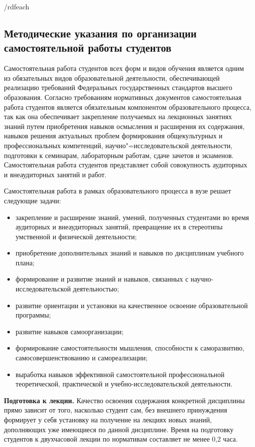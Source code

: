 \documentclass[12pt]{scrartcl}
\renewcommand{\paragraph}[1]{\par\textbf{#1}}
\begin{document}
{{/rdfeach}}



\subsection{Методические указания по организации самостоятельной работы студентов} %

Самостоятельная работа студентов всех форм и видов обучения является одним из
обязательных видов образовательной деятельности, обеспечивающей реализацию
требований Федеральных государственных стандартов высшего образования. Согласно
требованиям нормативных документов самостоятельная работа студентов является
обязательным компонентом образовательного процесса, так как она обеспечивает
закрепление получаемых на лекционных занятиях знаний путем приобретения навыков
осмысления и расширения их содержания, навыков решения актуальных проблем
формирования общекультурных и профессиональных компетенций, научно"=исследовательской деятельности, подготовки к семинарам, лабораторным работам, сдаче зачетов и экзаменов. Самостоятельная работа студентов представляет собой совокупность
аудиторных и внеаудиторных занятий и работ.

Самостоятельная работа в рамках
образовательного процесса в вузе решает следующие задачи:
\begin{itemize}
\item закрепление и расширение знаний, умений, полученных студентами во время
аудиторных и внеаудиторных занятий, превращение их в стереотипы умственной и
физической деятельности;
\item приобретение дополнительных знаний и навыков по дисциплинам учебного плана;
\item формирование и развитие знаний и навыков, связанных с научно-исследовательской
деятельностью;
\item развитие ориентации и установки на качественное освоение образовательной
программы;
\item развитие навыков самоорганизации;
\item формирование самостоятельности мышления, способности к саморазвитию,
самосовершенствованию и самореализации;
\item выработка навыков эффективной самостоятельной профессиональной теоретической,
  практической и учебно-исследовательской деятельности.
\end{itemize}

\paragraph{Подготовка к лекции.} Качество освоения содержания конкретной дисциплины
прямо зависит от того, насколько студент сам, без внешнего принуждения формирует у
себя установку на получение на лекциях новых знаний, дополняющих уже имеющиеся по
данной дисциплине. Время на подготовку студентов к двухчасовой лекции по нормативам
составляет не менее 0,2 часа.
\end{document}
